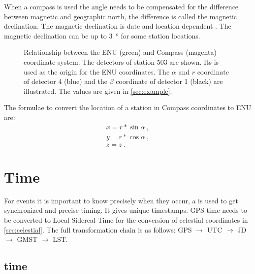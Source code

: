 When a compass is used the angle needs to be compensated for the
difference between magnetic and geographic north, the difference is
called the magnetic declination. The magnetic declination is date and
location dependent \cite{canada:2013aa}. The magnetic declination can be
up to \SI{3}{\degree} for some \hisparc station locations.

\begin{figure}
    \centering
    
    \caption{Relationship between the ENU (green) and Compass (magenta)
             coordinate system. The detectors of station 503 are shown.
             Its \gps is used as the origin for the ENU coordinates. The
             $\alpha$ and $r$ coordinate of detector 4 (blue) and the
             $\beta$ coordinate of detector 1 (black) are illustrated.
             The values are given in \cref{sec:example}.}
    \label{fig:enu_compass}
\end{figure}

The formulae to convert the location of a station in Compass coordinates
to ENU are:
%
\begin{equation}
    \begin{array}{l}
        x = r * \sin{\alpha} \ , \\
        y = r * \cos{\alpha} \ , \\
        z = z \ .
    \end{array}
\end{equation}


\section{Time}
\label{sec:time}

For \hisparc events it is important to know precisely when they occur, a
\gps is used to get synchronized and precise timing. It gives
unique timestamps. GPS time needs to be converted to Local Sidereal Time for
the conversion of celestial coordinates in \cref{sec:celestial}. The
full transformation chain is as follows: GPS $\to$ UTC $\to$ JD $\to$
GMST $\to$ LST.


\subsection{\gps time}

